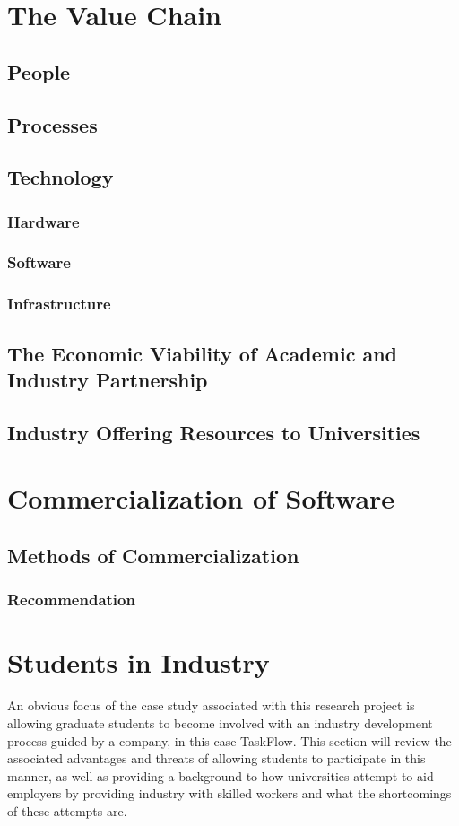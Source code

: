 \section{The Value Chain}
\subsection{People}
\subsection{Processes}
\subsection{Technology}
\subsubsection{Hardware}
\subsubsection{Software}
\subsubsection{Infrastructure}
\subsection{The Economic Viability of Academic and Industry Partnership}
\subsection{Industry Offering Resources to Universities}

\section{Commercialization of Software}
\subsection{Methods of Commercialization}
\subsubsection{Recommendation}

\section{Students in Industry}
\par{An obvious focus of the case study associated with this research project is allowing graduate students to become involved with an industry development process guided by a company, in this case TaskFlow. This section will review the associated advantages and threats of allowing students to participate in this manner, as well as providing a background to how universities attempt to aid employers by providing industry with skilled workers and what the shortcomings of these attempts are.}
